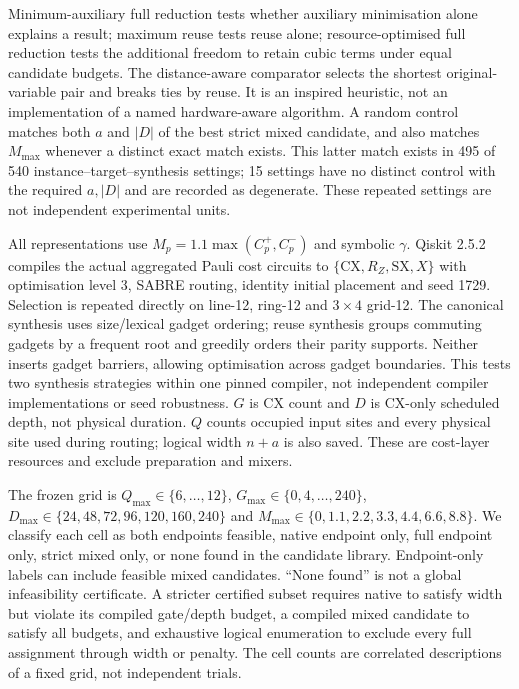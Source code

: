 Minimum-auxiliary full reduction tests whether auxiliary minimisation alone
explains a result; maximum reuse tests reuse alone; resource-optimised full
reduction tests the additional freedom to retain cubic terms under equal
candidate budgets. The distance-aware comparator selects the shortest
original-variable pair and breaks ties by reuse. It is an inspired heuristic,
not an implementation of a named hardware-aware algorithm. A random control
matches both $a$ and $|D|$ of the best strict mixed candidate, and also matches
$M_{\max}$ whenever a distinct exact match exists. This latter match exists
in 495 of 540 instance--target--synthesis settings; 15 settings have no
distinct control with the required $a,|D|$ and are recorded as degenerate.
These repeated settings are not independent experimental units.

All representations use $M_p=1.1\max(C_p^+,C_p^-)$ and symbolic $\gamma$.
Qiskit 2.5.2 compiles the actual aggregated Pauli cost circuits to
$\{\mathrm{CX},R_Z,\mathrm{SX},X\}$ with optimisation level 3, SABRE routing,
identity initial placement and seed 1729. Selection is repeated directly on
line-12, ring-12 and $3\times4$ grid-12. The canonical synthesis uses
size/lexical gadget ordering; reuse synthesis groups commuting gadgets by
a frequent root and greedily orders their parity supports. Neither inserts
gadget barriers, allowing optimisation across gadget boundaries. This tests
two synthesis strategies within one pinned compiler, not independent compiler
implementations or seed robustness. $G$ is CX count and $D$ is CX-only
scheduled depth, not physical duration. $Q$ counts occupied input sites and
every physical site used during routing; logical width $n+a$ is also saved.
These are cost-layer resources and exclude preparation and mixers.

The frozen grid is $Q_{\max}\in\{6,\ldots,12\}$,
$G_{\max}\in\{0,4,\ldots,240\}$,
$D_{\max}\in\{24,48,72,96,120,160,240\}$ and
$M_{\max}\in\{0,1.1,2.2,3.3,4.4,6.6,8.8\}$.
We classify each cell as both endpoints feasible, native endpoint only,
full endpoint only, strict mixed only, or none found in the candidate
library. Endpoint-only labels can include feasible mixed candidates.
``None found'' is not a global infeasibility certificate. A stricter
certified subset requires native to satisfy width but violate its compiled
gate/depth budget, a compiled mixed candidate to satisfy all budgets, and
exhaustive logical enumeration to exclude every full assignment through
width or penalty. The cell counts are correlated descriptions of a fixed
grid, not independent trials.

